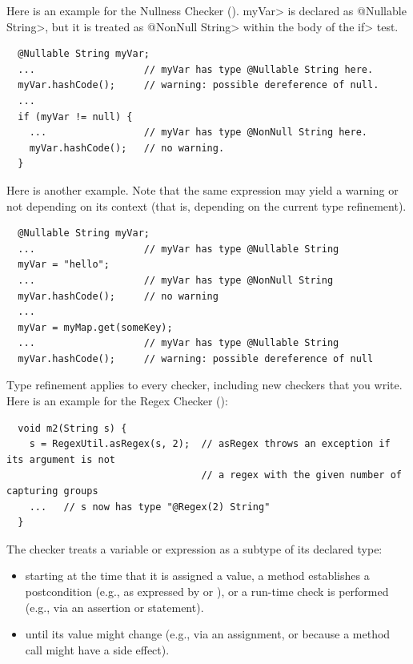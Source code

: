 
Here is an example for the Nullness Checker
().
\<myVar> is declared as \<@Nullable String>, but
it is treated as \<@NonNull String> within the body of the \<if> test.

\begin{Verbatim}
  @Nullable String myVar;
  ...                   // myVar has type @Nullable String here.
  myVar.hashCode();     // warning: possible dereference of null.
  ...
  if (myVar != null) {
    ...                 // myVar has type @NonNull String here.
    myVar.hashCode();   // no warning.
  }
\end{Verbatim}

Here is another example.
Note that the same expression may yield a
warning or not depending on its context (that is, depending on the current
type refinement).

\begin{Verbatim}
  @Nullable String myVar;
  ...                   // myVar has type @Nullable String
  myVar = "hello";
  ...                   // myVar has type @NonNull String
  myVar.hashCode();     // no warning
  ...
  myVar = myMap.get(someKey);
  ...                   // myVar has type @Nullable String
  myVar.hashCode();     // warning: possible dereference of null
\end{Verbatim}

Type refinement applies to every checker, including new
checkers that you write.  Here is an example for the Regex Checker
():

\begin{Verbatim}
  void m2(String s) {
    s = RegexUtil.asRegex(s, 2);  // asRegex throws an exception if its argument is not
                                  // a regex with the given number of capturing groups
    ...   // s now has type "@Regex(2) String"
  }
\end{Verbatim}



The checker treats a variable or expression as a subtype of its declared type:
\begin{itemize}
\item
  starting at the time that
  it is assigned a value,
  a method establishes a postcondition (e.g., as
  expressed by  or
  ), or
  a run-time check is performed (e.g., via an assertion or
   statement).
\item
until its value might change (e.g.,
via an assignment, or because a method call might have a side effect).
\end{itemize}

